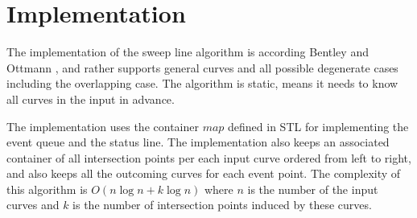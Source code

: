 \section{Implementation}

The implementation of the sweep line algorithm is according 
Bentley and Ottmann \cite{bkos-cgaa-97}, and rather supports general curves and all 
possible degenerate cases including the overlapping case. 
The algorithm is static, means it needs to know all curves in the input 
in advance. 

The implementation uses the container $map$ defined in STL for
implementing the event queue and the status line. The implementation
also keeps an associated container of all 
intersection points per each input curve ordered from left to right, 
and also keeps all the outcoming curves for each event point. 
The complexity of this algorithm is $O(n\log{n} + k\log{n})$ where $n$ is the 
number of the input curves and $k$ is the number of intersection points induced by these
curves.
